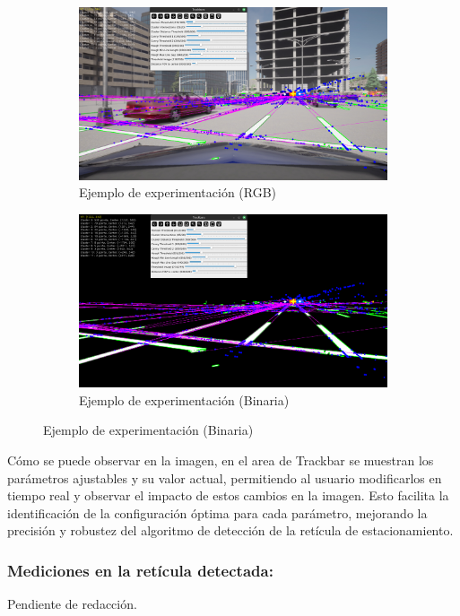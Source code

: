\begin{figure}[!ht]
    \begin{subfigure}{0.99\textwidth}
        \includegraphics[width=\textwidth]{img/reticule/experimentationRgb}
        \caption{Ejemplo de experimentación (RGB)}
        \label{fig:experimentationRgb}
    \end{subfigure}
    \begin{subfigure}{0.99\textwidth}
        \includegraphics[width=\textwidth]{img/reticule/experimentationBinary}
        \caption{Ejemplo de experimentación (Binaria)}
        \label{fig:experimentationBinary}
    \end{subfigure}
\end{figure}

\noindent
Cómo se puede observar en la imagen, en el area de Trackbar se muestran los parámetros ajustables y su valor actual,
permitiendo al usuario modificarlos en tiempo real y observar el impacto de estos cambios en la imagen.
Esto facilita la identificación de la configuración óptima para cada parámetro, mejorando la precisión
y robustez del algoritmo de detección de la retícula de estacionamiento.

\subsubsection{Mediciones en la retícula detectada:}
Pendiente de redacción.
